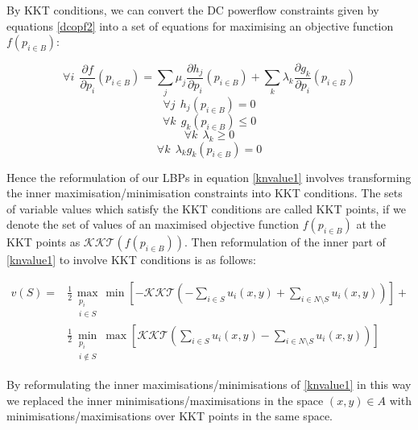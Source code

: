 By KKT conditions, we can convert the DC powerflow constraints given by equations \ref{dcopf2} into a set of equations for maximising an objective function $f(p_{i\in B})$:

\begin{equation}\forall i~~\frac{\partial f}{\partial p_i}(p_{i\in B})=\sum_j\mu_j\frac{\partial h_j}{\partial p_i}(p_{i\in B}) + \sum_k\lambda_k\frac{\partial g_k}{\partial p_i}(p_{i\in B})\end{equation}
\begin{equation}\forall j~~ h_j(p_{i\in B})=0\end{equation}
\begin{equation}\forall k~~ g_k(p_{i\in B})\le 0\end{equation}
\begin{equation}\forall k~~ \lambda_k \ge 0\end{equation}
\begin{equation}\label{eq:complementarity_constraint_KKT}\forall k~~ \lambda_kg_k(p_{i\in B}) = 0\end{equation}

Hence the reformulation of our LBPs in equation \ref{knvalue1} involves transforming the inner maximisation/minimisation constraints into KKT conditions.
The sets of variable values which satisfy the KKT conditions are called KKT points, if we denote the set of values of an maximised objective function $f(p_{i\in B})$ at the KKT points as $\mathcal{KKT}(f(p_{i\in B}))$.
Then reformulation of the inner part of \eqref{knvalue1} to involve KKT conditions is as follows:




\begin{equation}
\label{kkt_optimization1}
\begin{aligned}
v(S) =& 
 \frac{1}{2}\max_{\substack{p_i \\ i\in S}}   \min\left[-\mathcal{KKT}\left(-\sum_{i\in S} u_i(x,y) + \sum_{i\in N\setminus S}u_i(x,y)\right)\right] +\\
&\frac{1}{2}\min_{\substack{p_i \\ i\notin S}}\max\left[\mathcal{KKT}\left(\sum_{i\in S} u_i(x,y) - \sum_{i\in N\setminus S}u_i(x,y)\right)\right]
\end{aligned}
\end{equation}


By reformulating the inner maximisations/minimisations of \eqref{knvalue1} in this way we replaced the inner minimisations/maximisations in the space $(x,y)\in A$ with minimisations/maximisations over KKT points in the same space.%

